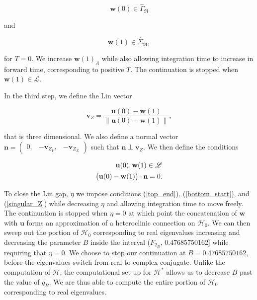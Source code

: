 \documentclass{ws-ijbc}
\begin{document}
\begin{equation}
	\mathbf{w}(0) \in \widehat{\Gamma}_{\Re}
	\label{bottom_start}
\end{equation}

and

\begin{equation}
	\mathbf{w}(1) \in \widehat{\Sigma}_{\Re},
\end{equation}

\noindent
for $T=0$.  We increase $\mathbf{w}(1)_A$ while also allowing integration time to increase in forward time, corresponding to positive $T$.  The continuation is stopped when $\mathbf{w}(1) \in \mathscr{L}$.

In the third step, we define the Lin vector 

\begin{equation}
	\mathbf{v}_Z = \frac{\mathbf{u}(0) - \mathbf{w}(1)}{\left\lVert \mathbf{u}(0) - \mathbf{w}(1) \right\lVert},
	\label{Lin_vector_singular}
\end{equation}

\noindent
that is three dimensional.  We also define a normal vector $\mathbf{n} = \begin{pmatrix} 0, & -\mathbf{v}_{Z_Y}, &-\mathbf{v}_{Z_X} \end{pmatrix}$ such that $\mathbf{n} \perp \mathbf{v}_Z$.  We then define the conditions 

\begin{align}
	\begin{split}
		\mathbf{u}(0), \mathbf{w}(1) \in \mathscr{L} \\ \vspace{2mm}
		\begin{pmatrix}\mathbf{u}(0) - \mathbf{w}(1)\end{pmatrix} \cdot \mathbf{n} =0.
	\end{split}
	\label{singular_Z}
\end{align}

\noindent
To close the Lin gap, $\eta$ we impose conditions (\ref{top_end}), (\ref{bottom_start}), and (\ref{singular_Z}) while decreasing $\eta$ and allowing integration time to move freely.  The continuation is stopped when $\eta = 0$ at which point the concatenation of $\mathbf{w}$ with $\mathbf{u}$ forms an approximation of a heteroclinic connection on $\mathscr{H}_0$.  We can then sweep out the portion of $\mathscr{H}_0$ corresponding to real eigenvalues increasing and decreasing the parameter $B$ inside the interval ($F_{2_B}$, 0.47685750162] while requiring that $\eta=0$.  We choose to stop our continuation at $B = 0.47685750162$, before the eigenvalues switch from real to complex conjugate.  Unlike the computation of $\mathscr{H}$, the computational set up for $\mathscr{H^*}$ allows us to decrease $B$ past the value of $q_B$.  We are thus able to compute the entire portion of $\mathscr{H}_0$ corresponding to real eigenvalues.
\end{document}
